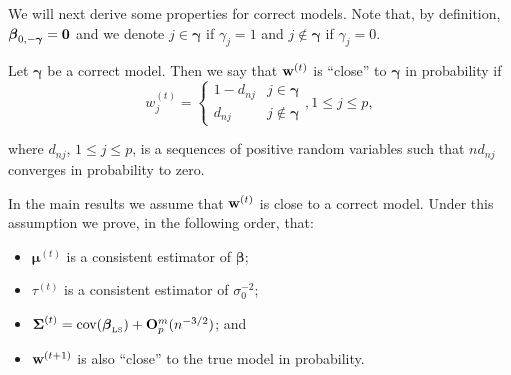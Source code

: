 \documentclass[11pt]{article}
\newtheorem{Main Result}{Main Result}
\def\vectorfontone{\bf}
\def\vectorfonttwo{\boldsymbol}
\def\vw{{\vectorfontone w}}                      %
\def\vone{{\vectorfontone 1}}
\def\vzero{{\vectorfontone 0}}
\def\vbeta{{\vectorfonttwo \beta}}               %
\def\vgamma{{\vectorfonttwo \gamma}}             %
\def\vmu{{\vectorfonttwo \mu}}                   %
\def\matrixfontone{\bf}
\def\matrixfonttwo{\boldsymbol}
\def\mO{{\matrixfontone O}}                      %
\def\mX{{\matrixfontone X}}                      %
\def\mSigma{{\matrixfonttwo \Sigma}}             %
\def\ds{\displaystyle}
\begin{document}
\noindent
We will next derive some properties for correct models.  %
\noindent Note that, by definition, $\vbeta_{0,-\vgamma} = \vzero$ and we denote
$j\in\vgamma$ if $\gamma_j=1$ and $j\not\in\vgamma$ if $\gamma_j=0$.


\medskip
{} Let $\vgamma$ be a correct model. Then we
say that $\vw^{(t)}$ is ``close'' to $\vgamma$ in probability if
$$
\ds w_j^{(t)} = \left\{ \begin{array}{ll}
1 - d_{nj}   & j\in\vgamma \\
d_{nj}     & j\notin\vgamma
\end{array}\right., 1\leq j\leq p,
$$

\noindent where $d_{nj}$, $1\le j\le p$, is a sequences of
positive random variables such that $nd_{nj}$ converges in probability
to zero.

\medskip
\noindent
In the main results we assume that $\vw^{(t)}$ is close to a correct model.
Under this assumption we prove, in the following order, that:
\begin{itemize}
	\item $\vmu^{(t)}$ is a consistent estimator of $\vbeta$;
	\item $\tau^{(t)}$ is a consistent estimator of $\sigma_0^{-2}$;
	\item $\mSigma^{(t)} = \mbox{cov}(\vbeta_{\mbox{\tiny LS}}) + \mO_p^m(n^{-3/2})$; and
	\item $\vw^{(t+1)}$ is also ``close'' to the true model in probability.
\end{itemize}
\end{document}
